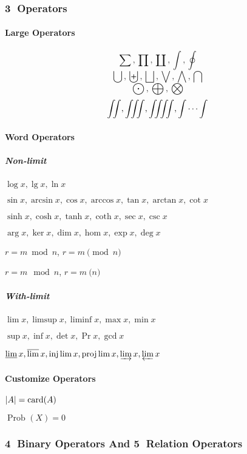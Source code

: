\subsubsection{\textcircled{3} Operators}
\paragraph{Large Operators}
\[
    \sum, \prod, \coprod, \int, \oint
\]
\[
    \bigcup, \biguplus, \bigsqcup, \bigvee, \bigwedge, \bigcap
\]
\[
    \bigodot, \bigoplus, \bigotimes
\]
\[
    \iint, \iiint, \iiiint, \idotsint       %
\]

\paragraph{Word Operators}
\subparagraph{Non-limit}
{\LARGE
    $ \log x, \lg x, \ln x $
    
    $ \sin x, \arcsin x, \cos x, \arccos x, \tan x, \arctan x, \cot x $
    
    $ \sinh x, \cosh x, \tanh x, \coth x, \sec x, \csc x $

    $ \arg x, \ker x, \dim x, \hom x, \exp x, \deg x $

    $ r = m \bmod n $, $ r = m \pmod n $

    $ r = m \mod n $, $ r = m \pod n $      %
}

\subparagraph{With-limit}
{\LARGE
    $ \lim x, \limsup x, \liminf x, \max x, \min x $
    
    $ \sup x, \inf x, \det x, \Pr x, \gcd x $

    $ \varliminf x, \varlimsup x, \injlim x, \projlim x, \varinjlim x, \varprojlim x $      %
}

\paragraph{Customize Operators}
{\LARGE
    $ |A| = \operatorname{card} (A) $     %

    $ \operatorname*{Prob}_{} (X) = 0 $     %
}

\subsubsection{\textcircled{4} Binary Operators And \textcircled{5} Relation Operators}
